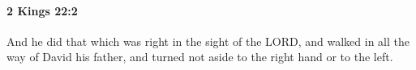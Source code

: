 
		\paragraph{2 Kings 22:2} %
			\label{2KINGS-22-2}

			And he did that which was right in the sight of the LORD, and walked in all the way of David his father, and turned not aside to the right hand or to the left.



